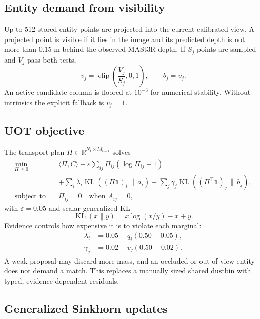 \documentclass[11pt]{article}
\newcommand{\R}{\mathbb{R}}
\newcommand{\1}{\bm{1}}
\newcommand{\KL}{\operatorname{KL}}
\newcommand{\clip}{\operatorname{clip}}
\begin{document}
\subsection{Entity demand from visibility}

Up to 512 stored entity points are projected into the current calibrated view.
A projected point is visible if it lies in the image and its predicted depth is
not more than $0.15$ m behind the observed MASt3R depth. If $S_j$ points are
sampled and $V_j$ pass both tests,
\begin{equation}
v_j=\clip\left(\frac{V_j}{S_j},0,1\right),\qquad b_j=v_j.
\end{equation}
An active candidate column is floored at $10^{-3}$ for numerical stability.
Without intrinsics the explicit fallback is $v_j=1$.

\subsection{UOT objective}

The transport plan $\Pi\in\R_+^{N_t\times M_{t-1}}$ solves
\begin{align}
\min_{\Pi\geq0}\quad
&\langle \Pi,C\rangle
+\varepsilon\sum_{ij}\Pi_{ij}(\log\Pi_{ij}-1)\\
&+\sum_i\lambda_i\KL((\Pi\1)_i\,\|\,a_i)
+\sum_j\gamma_j\KL((\Pi^\top\1)_j\,\|\,b_j),\\
\text{subject to}\quad &\Pi_{ij}=0\quad\text{when }A_{ij}=0,
\label{eq:uot}
\end{align}
with $\varepsilon=0.05$ and scalar generalized KL
\begin{equation}
\KL(x\|y)=x\log(x/y)-x+y.
\end{equation}
Evidence controls how expensive it is to violate each marginal:
\begin{align}
\lambda_i&=0.05+q_i(0.50-0.05),\\
\gamma_j&=0.02+v_j(0.50-0.02).
\end{align}
A weak proposal may discard more mass, and an occluded or out-of-view entity
does not demand a match. This replaces a manually sized shared dustbin with
typed, evidence-dependent residuals.

\subsection{Generalized Sinkhorn updates}
\end{document}
